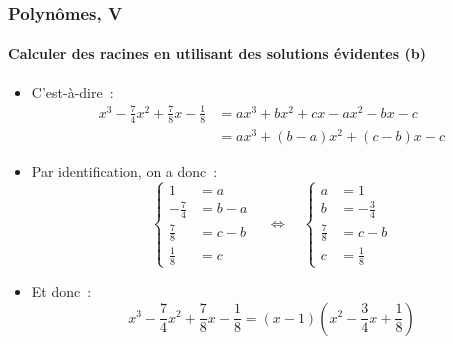 \documentclass[10pt,notheorems]{beamer}
\theoremstyle{plain}
\theoremstyle{definition} %
\begin{document}
\begin{frame}
  \frametitle{Polynômes, V}
  \framesubtitle{Calculer des racines en utilisant des solutions évidentes (b)}
  \hypertarget{slide_polynome_2_racines_5_3}{}

  \bigskip

  \begin{itemize}

  \item C'est-à-dire~:
    \[
      \begin{split}
        x^3-\frac{7}{4}x^2+\frac{7}{8}x -\frac{1}{8} &= ax^3 + bx^2 + cx - ax^2 - bx - c\\
        &= ax^3 + (b-a)x^2 + (c-b)x -c
      \end{split}
    \]

  \item Par identification, on a donc~:
    \[
      \begin{cases}
        1 &= a\\
        -\frac{7}{4} &= b-a\\
        \frac{7}{8} &= c-b\\
        \frac{1}{8} &= c
      \end{cases}
      \quad
      \Leftrightarrow
      \quad
      \begin{cases}
        a &= 1\\
        b &= -\frac{3}{4}\\
        \frac{7}{8} &= c-b\\
        c &= \frac{1}{8}
      \end{cases}
    \]

  \item Et donc~:
    \[
      x^3-\frac{7}{4}x^2+\frac{7}{8}x -\frac{1}{8} = (x-1)\left(x^2-\frac{3}{4}x+\frac{1}{8}\right)
    \]

  \end{itemize}

\end{frame}
\end{document}
